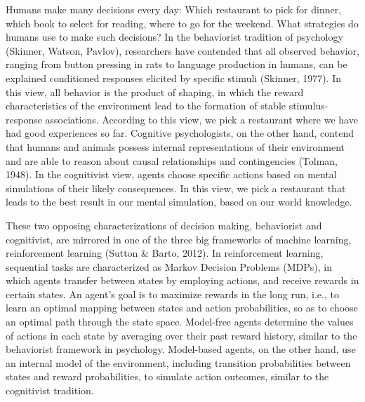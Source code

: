 \documentclass[11pt]{article} %
\begin{document}
Humans make many decisions every day: Which restaurant to pick for dinner, which book to select for reading, where to go for the weekend. What strategies do humans use to make such decisions? In the behaviorist tradition of psychology (Skinner, Watson, Pavlov), researchers have contended that all observed behavior, ranging from button pressing in rats to language production in humans, can be explained conditioned responses elicited by specific stimuli (Skinner, 1977). In this view, all behavior is the product of shaping, in which the reward characteristics of the environment lead to the formation of stable stimulus-response associations. According to this view, we pick a restaurant where we have had good experiences so far. Cognitive psychologists, on the other hand, contend that humans and animals possess internal representations of their environment and are able to reason about causal relationships and contingencies (Tolman, 1948). In the cognitivist view, agents choose specific actions based on mental simulations of their likely consequences. In this view, we pick a restaurant that leads to the best result in our mental simulation, based on our world knowledge.

These two opposing characterizations of decision making, behaviorist and cognitivist, are mirrored in one of the three big frameworks of machine learning, reinforcement learning (Sutton \& Barto, 2012). In reinforcement learning, sequential tasks are characterized as Markov Decision Problems (MDPs), in which agents transfer between states by employing actions, and receive rewards in certain states. An agent's goal is to maximize rewards in the long run, i.e., to learn an optimal mapping between states and action probabilities, so as to choose an optimal path through the state space. Model-free agents determine the values of actions in each state by averaging over their past reward history, similar to the behaviorist framework in psychology. Model-based agents, on the other hand, use an internal model of the environment, including transition probabilities between states and reward probabilities, to simulate action outcomes, similar to the cognitivist tradition.
\end{document}
